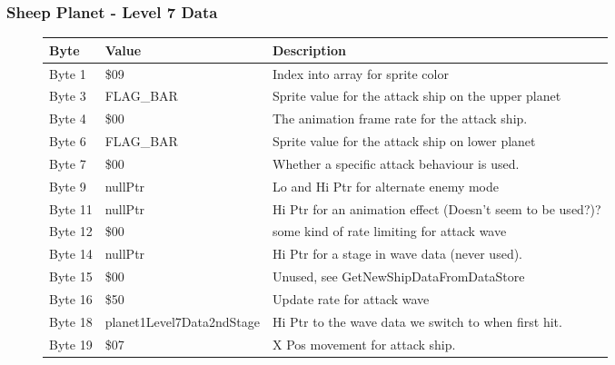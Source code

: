 \clearpage
\subsubsection{Sheep Planet - Level 7 Data}

\begin{figure}[H]
  {
  \setlength{\tabcolsep}{3.0pt}
  \setlength\cmidrulewidth{\heavyrulewidth} %
  \begin{adjustbox}{width=12cm}

\begin{tabular}{lll}
\toprule
 Byte    & Value                     & Description                                                        \\
\midrule
 Byte 1  & \$09                       & Index into array for sprite color                                  \\
 Byte 3  & FLAG\_BAR                  & Sprite value for the attack ship on the upper planet               \\
 Byte 4  & \$00                       & The animation frame rate for the attack ship.                      \\
 Byte 6  & FLAG\_BAR                  & Sprite value for the attack ship on lower planet                   \\
 Byte 7  & \$00                       & Whether a specific attack behaviour is used.                       \\
 Byte 9  & nullPtr                   & Lo and Hi Ptr for alternate enemy mode                             \\
 Byte 11 & nullPtr                   & Hi Ptr for an animation effect (Doesn't seem to be used?)?         \\
 Byte 12 & \$00                       & some kind of rate limiting for attack wave                         \\
 Byte 14 & nullPtr                   & Hi Ptr for a stage in wave data (never used).                      \\
 Byte 15 & \$00                       & Unused, see GetNewShipDataFromDataStore                            \\
 Byte 16 & \$50                       & Update rate for attack wave                                        \\
 Byte 18 & planet1Level7Data2ndStage & Hi Ptr to the wave data we switch to when first hit.               \\
 Byte 19 & \$07                       & X Pos movement for attack ship.                                    \\

\end{tabular}
\end{adjustbox}}
\end{figure}
